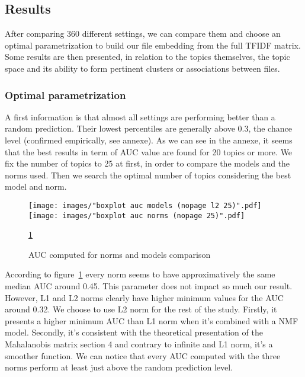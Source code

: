 \documentclass[a4paper]{article}
\begin{document}
	\subsection{Results}	
	
	After comparing 360 different settings, we can compare them and choose an optimal parametrization to build our file embedding from the full \ac{TFIDF} matrix. Some results are then presented, in relation to the topics themselves, the topic space and its ability to form pertinent clusters or associations between files.
	
	\subsubsection{Optimal parametrization}
	
	A first information is that almost all settings are performing better than a random prediction. Their lowest percentiles are generally above 0.3, the chance level (confirmed empirically, see annexe). As we can see in the annexe, it seems that the best results in term of \ac{AUC} value are found for 20 topics or more. We fix the number of topics to 25 at first, in order to compare the models and the norms used. Then we search the optimal number of topics considering the best model and norm.\\
	
	\begin{figure}[]
		\texttt{[image: images/"boxplot auc models (nopage l2 25)".pdf]}
		\label{fig:gridsearch-models}
		\endminipage\hfill
		\texttt{[image: images/"boxplot auc norms (nopage 25)".pdf]}
		\label{fig:gridsearch-norms}
		\endminipage
		\caption{AUC computed for norms and models comparison}
		\label{fig:gridsearch}
		\ref{fig:gridsearch}
	\end{figure}

	According to figure~\ref{fig:gridsearch} every norm seems to have approximatively the same median \ac{AUC} around 0.45. This parameter does not impact so much our result. However, L1 and L2 norms clearly have higher minimum values for the \ac{AUC} around 0.32. We choose to use L2 norm for the rest of the study. Firstly, it presents a higher minimum \ac{AUC} than L1 norm when it's combined with a \ac{NMF} model. Secondly, it's consistent with the theoretical presentation of the Mahalanobis matrix section 4 and contrary to infinite and L1 norm, it's a smoother function. We can notice that every \ac{AUC} computed with the three norms perform at least just above the random prediction level.
	
\end{document}

